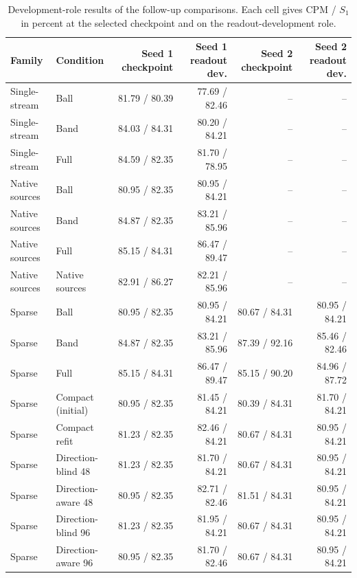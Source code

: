 \begin{table}[!t]
\centering
\footnotesize\setlength{\tabcolsep}{4pt}
\caption{Development-role results of the follow-up comparisons. Each cell gives CPM / $S_1$ in percent at the selected checkpoint and on the readout-development role.}
\label{tab:new_dev}
\begin{tabular}{@{}llrrrr@{}}
\toprule
Family & Condition & Seed 1 checkpoint & Seed 1 readout dev. & Seed 2 checkpoint & Seed 2 readout dev. \\
\midrule
Single-stream & Ball & 81.79 / 80.39 & 77.69 / 82.46 & -- & -- \\
Single-stream & Band & 84.03 / 84.31 & 80.20 / 84.21 & -- & -- \\
Single-stream & Full & 84.59 / 82.35 & 81.70 / 78.95 & -- & -- \\
\midrule
Native sources & Ball & 80.95 / 82.35 & 80.95 / 84.21 & -- & -- \\
Native sources & Band & 84.87 / 82.35 & 83.21 / 85.96 & -- & -- \\
Native sources & Full & 85.15 / 84.31 & 86.47 / 89.47 & -- & -- \\
Native sources & Native sources & 82.91 / 86.27 & 82.21 / 85.96 & -- & -- \\
\midrule
Sparse & Ball & 80.95 / 82.35 & 80.95 / 84.21 & 80.67 / 84.31 & 80.95 / 84.21 \\
Sparse & Band & 84.87 / 82.35 & 83.21 / 85.96 & 87.39 / 92.16 & 85.46 / 82.46 \\
Sparse & Full & 85.15 / 84.31 & 86.47 / 89.47 & 85.15 / 90.20 & 84.96 / 87.72 \\
Sparse & Compact (initial) & 80.95 / 82.35 & 81.45 / 84.21 & 80.39 / 84.31 & 81.70 / 84.21 \\
Sparse & Compact refit & 81.23 / 82.35 & 82.46 / 84.21 & 80.67 / 84.31 & 80.95 / 84.21 \\
Sparse & Direction-blind 48 & 81.23 / 82.35 & 81.70 / 84.21 & 80.67 / 84.31 & 80.95 / 84.21 \\
Sparse & Direction-aware 48 & 80.95 / 82.35 & 82.71 / 82.46 & 81.51 / 84.31 & 80.95 / 84.21 \\
Sparse & Direction-blind 96 & 81.23 / 82.35 & 81.95 / 84.21 & 80.67 / 84.31 & 80.95 / 84.21 \\
Sparse & Direction-aware 96 & 80.95 / 82.35 & 81.70 / 82.46 & 80.67 / 84.31 & 80.95 / 84.21 \\
\bottomrule
\end{tabular}
\end{table}
